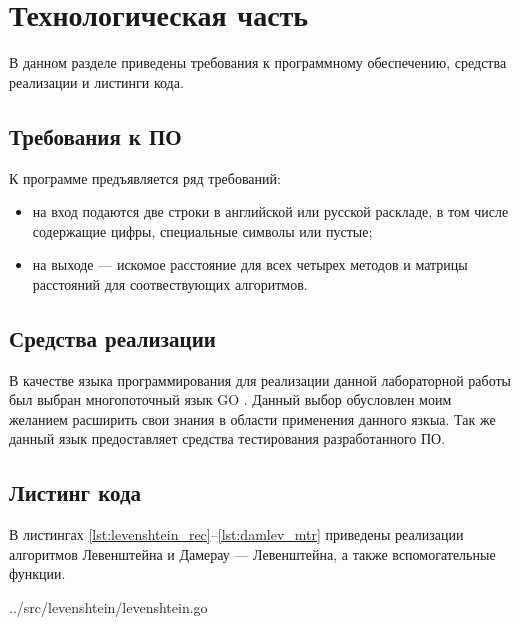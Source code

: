 \chapter{Технологическая часть}

В данном разделе приведены требования к программному обеспечению, средства реализации и листинги кода.

\section{Требования к ПО}

К программе предъявляется ряд требований:
\begin{itemize}
	\item на вход подаются две строки в английской или русской раскладе, в том числе содержащие цифры, специальные символы или пустые;
	\item на выходе — искомое расстояние для всех четырех методов и матрицы расстояний для соотвествующих алгоритмов.
\end{itemize}

\section{Средства реализации}

В качестве языка программирования для реализации данной лабораторной работы был выбран многопоточный язык GO \cite{golang}. Данный выбор обусловлен моим желанием расширить свои знания в области применения данного язкыа. Так же данный язык предоставляет средства тестирования разработанного ПО.

\section{Листинг кода}

В листингах \ref{lst:levenshtein_rec}--\ref{lst:damlev_mtr} приведены реализации алгоритмов Левенштейна и Дамерау — Левенштейна, а также вспомогательные функции.

\clearpage

\captionsetup{singlelinecheck = false, justification=raggedright}

\begin{lstinputlisting}[
	caption={Алгоритм Левенштейна},
	label={lst:levenshtein_rec},
	style={go},
	linerange={3-31},
	]{../src/levenshtein/levenshtein.go}
\end{lstinputlisting}

\clearpage


